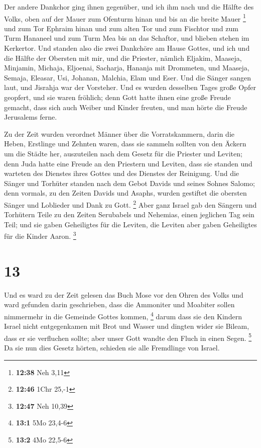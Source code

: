  Der andere Dankchor ging ihnen gegenüber, und ich ihm nach
und die Hälfte des Volks, oben auf der Mauer zum Ofenturm hinan und bis
an die breite Mauer \footnote{\textbf{12:38} Neh 3,11}  und
zum Tor Ephraim hinan und zum alten Tor und zum Fischtor und zum Turm
Hananeel und zum Turm Mea bis an das Schaftor, und blieben stehen im
Kerkertor.  Und standen also die zwei Dankchöre am Hause
Gottes, und ich und die Hälfte der Obersten mit mir,  und
die Priester, nämlich Eljakim, Maaseja, Minjamin, Michaja, Eljoenai,
Sacharja, Hananja mit Drommeten,  und Maaseja, Semaja,
Eleasar, Usi, Johanan, Malchia, Elam und Eser. Und die Sänger sangen
laut, und Jisrahja war der Vorsteher.  Und es wurden
desselben Tages große Opfer geopfert, und sie waren fröhlich; denn Gott
hatte ihnen eine große Freude gemacht, dass sich auch Weiber und Kinder
freuten, und man hörte die Freude Jerusalems ferne.

 Zu der Zeit wurden verordnet Männer über die
Vorratskammern, darin die Heben, Erstlinge und Zehnten waren, dass sie
sammeln sollten von den Äckern um die Städte her, auszuteilen nach dem
Gesetz für die Priester und Leviten; denn Juda hatte eine Freude an den
Priestern und Leviten, dass sie standen  und warteten des
Dienstes ihres Gottes und des Dienstes der Reinigung. Und die Sänger und
Torhüter standen nach dem Gebot Davids und seines Sohnes Salomo;
 denn vormals, zu den Zeiten Davids und Asaphs, wurden
gestiftet die obersten Sänger und Loblieder und Dank zu Gott.
\footnote{\textbf{12:46} 1Chr 25,-1}  Aber ganz Israel gab
den Sängern und Torhütern Teile zu den Zeiten Serubabels und Nehemias,
einen jeglichen Tag sein Teil; und sie gaben Geheiligtes für die
Leviten, die Leviten aber gaben Geheiligtes für die Kinder Aaron.
\footnote{\textbf{12:47} Neh 10,39}

\hypertarget{section-2}{%
\section{13}\label{section-2}}

 Und es ward zu der Zeit gelesen das Buch Mose vor den Ohren
des Volks und ward gefunden darin geschrieben, dass die Ammoniter und
Moabiter sollen nimmermehr in die Gemeinde Gottes kommen, \footnote{\textbf{13:1}
  5Mo 23,4-6}  darum dass sie den Kindern Israel nicht
entgegenkamen mit Brot und Wasser und dingten wider sie Bileam, dass er
sie verfluchen sollte; aber unser Gott wandte den Fluch in einen Segen.
\footnote{\textbf{13:2} 4Mo 22,5-6}  Da sie nun dies Gesetz
hörten, schieden sie alle Fremdlinge von Israel.

